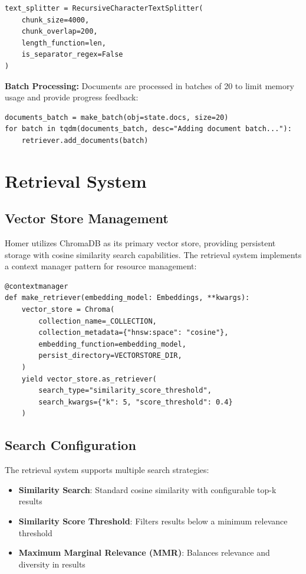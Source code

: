 \documentclass[11pt,a4paper]{report}
\begin{document}
\begin{lstlisting}[caption={Text splitting configuration}]
text_splitter = RecursiveCharacterTextSplitter(
    chunk_size=4000,
    chunk_overlap=200,
    length_function=len,
    is_separator_regex=False
)
\end{lstlisting}

\textbf{Batch Processing:}
Documents are processed in batches of 20 to limit memory usage and provide progress feedback:

\begin{lstlisting}[caption={Batch processing implementation}]
documents_batch = make_batch(obj=state.docs, size=20)
for batch in tqdm(documents_batch, desc="Adding document batch..."):
    retriever.add_documents(batch)
\end{lstlisting}

\section{Retrieval System}

\subsection{Vector Store Management}

Homer utilizes ChromaDB as its primary vector store, providing persistent storage with cosine similarity search capabilities. The retrieval system implements a context manager pattern for resource management:

\begin{lstlisting}[caption={Vector store retriever implementation}]
@contextmanager
def make_retriever(embedding_model: Embeddings, **kwargs):
    vector_store = Chroma(
        collection_name=_COLLECTION,
        collection_metadata={"hnsw:space": "cosine"},
        embedding_function=embedding_model,
        persist_directory=VECTORSTORE_DIR,
    )
    yield vector_store.as_retriever(
        search_type="similarity_score_threshold", 
        search_kwargs={"k": 5, "score_threshold": 0.4}
    )
\end{lstlisting}

\subsection{Search Configuration}

The retrieval system supports multiple search strategies:

\begin{itemize}
    \item \textbf{Similarity Search}: Standard cosine similarity with configurable top-k results
    \item \textbf{Similarity Score Threshold}: Filters results below a minimum relevance threshold
    \item \textbf{Maximum Marginal Relevance (MMR)}: Balances relevance and diversity in results
\end{itemize}
\end{document}
